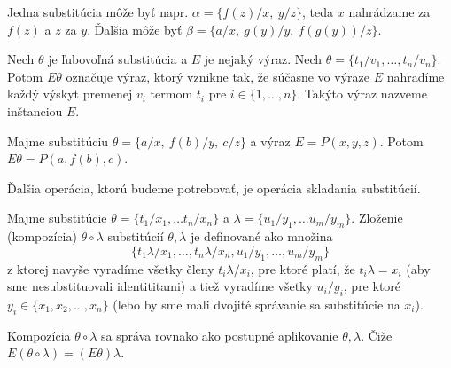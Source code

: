 \begin{priklad}
    Jedna substitúcia môže byť napr.
    $\alpha = \{ f(z)/x,\ y/z\}$, teda $x$ nahrádzame za $f(z)$ a
    $z$ za $y$.
    Ďalšia môže byť $\beta = \{ a/x,\ g(y)/y,\ f(g(y))/z\}$.
\end{priklad}

\begin{definicia}
    Nech $\theta$ je ľubovoľná substitúcia a $E$ je nejaký výraz.
    Nech $\theta = \{ t_1/v_1, \dots, t_n/v_n\}$.
    Potom $E\theta$ označuje výraz, ktorý vznikne tak,
    že súčasne vo výraze $E$ nahradíme každý výskyt premenej $v_i$ termom $t_i$
    pre $i \in \{1,\dots,n\}$. Takýto výraz nazveme inštanciou $E$.
\end{definicia}

\begin{priklad}
    Majme substitúciu $\theta=\{a/x,\ f(b)/y,\ c/z\}$
    a výraz $E = P(x, y, z)$.
    Potom $E\theta = P(a, f(b), c)$.
\end{priklad}

\medskip
\noindent
Ďalšia operácia, ktorú budeme potrebovať, je operácia skladania
substitúcií.

\begin{definicia}
    Majme substitúcie $\theta = \{t_1/x_1, \ldots t_n/x_n\}$ a
    $\lambda = \{ u_1/y_1, \ldots u_m/y_m \}$.
    Zloženie (kompozícia) $\theta \circ \lambda$ substitúcií
    $\theta,\lambda$ je definované ako množina
    \begin{equation*}
        \{t_1 \lambda/x_1, \dots, t_n \lambda/x_n, u_1/y_1, \dots, u_m/y_m \}
    \end{equation*}
    z ktorej navyše vyradíme všetky členy $t_i\lambda/x_i$,
    pre ktoré platí, že $t_i \lambda = x_i$ (aby sme nesubstituovali
    identititami)
    a tiež vyradíme všetky $u_i/y_i$,
    pre ktoré $y_i \in \{x_1, x_2, \dots, x_n\}$ (lebo by sme mali
    dvojité správanie sa substitúcie na $x_i$).
\end{definicia}

\begin{poznamka}
    Kompozícia $\theta \circ \lambda$ sa správa rovnako ako postupné
    aplikovanie $\theta, \lambda$. Čiže
    $E(\theta \circ \lambda) = (E\theta)\lambda$.
\end{poznamka}

